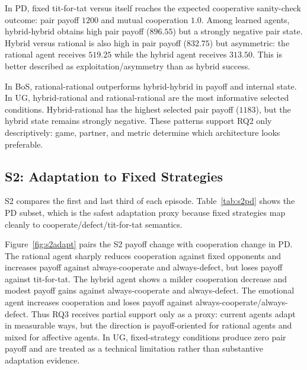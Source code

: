 \documentclass[runningheads]{llncs}
\begin{document}
In PD, fixed tit-for-tat versus itself reaches the expected cooperative sanity-check outcome: pair payoff $1200$ and mutual cooperation $1.0$. Among learned agents, hybrid-hybrid obtains high pair payoff ($896.55$) but a strongly negative pair state. Hybrid versus rational is also high in pair payoff ($832.75$) but asymmetric: the rational agent receives $519.25$ while the hybrid agent receives $313.50$. This is better described as exploitation/asymmetry than as hybrid success.

In BoS, rational-rational outperforms hybrid-hybrid in payoff and internal state. In UG, hybrid-rational and rational-rational are the most informative selected conditions. Hybrid-rational has the highest selected pair payoff ($1183$), but the hybrid state remains strongly negative. These patterns support RQ2 only descriptively: game, partner, and metric determine which architecture looks preferable.

\subsection{S2: Adaptation to Fixed Strategies}

S2 compares the first and last third of each episode. Table~\ref{tab:s2pd} shows the PD subset, which is the safest adaptation proxy because fixed strategies map cleanly to cooperate/defect/tit-for-tat semantics.

\begin{table}[t]
\centering
\caption{S2 adaptation proxy in the Prisoner's Dilemma: last third minus first third. Cooperation is reported as first-to-last; $\Delta$ payoff is agent~1 payoff change.}
\label{tab:s2pd}
\scriptsize

\end{table}

Figure~\ref{fig:s2adapt} pairs the S2 payoff change with cooperation change in PD. The rational agent sharply reduces cooperation against fixed opponents and increases payoff against always-cooperate and always-defect, but loses payoff against tit-for-tat. The hybrid agent shows a milder cooperation decrease and modest payoff gains against always-cooperate and always-defect. The emotional agent increases cooperation and loses payoff against always-cooperate/always-defect. Thus RQ3 receives partial support only as a proxy: current agents adapt in measurable ways, but the direction is payoff-oriented for rational agents and mixed for affective agents. In UG, fixed-strategy conditions produce zero pair payoff and are treated as a technical limitation rather than substantive adaptation evidence.
\end{document}
